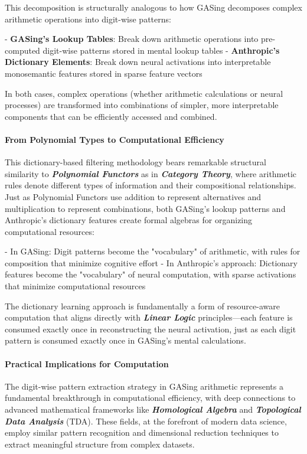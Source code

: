 This decomposition is structurally analogous to how GASing decomposes complex arithmetic operations into digit-wise patterns:

- \textbf{GASing's Lookup Tables}: Break down arithmetic operations into pre-computed digit-wise patterns stored in mental lookup tables
- \textbf{Anthropic's Dictionary Elements}: Break down neural activations into interpretable monosemantic features stored in sparse feature vectors

In both cases, complex operations (whether arithmetic calculations or neural processes) are transformed into combinations of simpler, more interpretable components that can be efficiently accessed and combined.
\paragraph{From Polynomial Types to Computational Efficiency}

This dictionary-based filtering methodology bears remarkable structural similarity to \textbf{\textbf{\textit{Polynomial Functors}}} as in \textbf{\textit{Category Theory}}, where arithmetic rules denote different types of information and their compositional relationships. Just as Polynomial Functors use addition to represent alternatives and multiplication to represent combinations, both GASing's lookup patterns and Anthropic's dictionary features create formal algebras for organizing computational resources:

- In GASing: Digit patterns become the "vocabulary" of arithmetic, with rules for composition that minimize cognitive effort
- In Anthropic's approach: Dictionary features become the "vocabulary" of neural computation, with sparse activations that minimize computational resources

The dictionary learning approach is fundamentally a form of resource-aware computation that aligns directly with \textbf{\textit{Linear Logic}} principles—each feature is consumed exactly once in reconstructing the neural activation, just as each digit pattern is consumed exactly once in GASing's mental calculations.
\paragraph{Practical Implications for Computation}

The digit-wise pattern extraction strategy in GASing arithmetic represents a fundamental breakthrough in computational efficiency, with deep connections to advanced mathematical frameworks like \textbf{\textit{Homological Algebra}} and \textbf{\textit{Topological Data Analysis}} (TDA). These fields, at the forefront of modern data science, employ similar pattern recognition and dimensional reduction techniques to extract meaningful structure from complex datasets.

